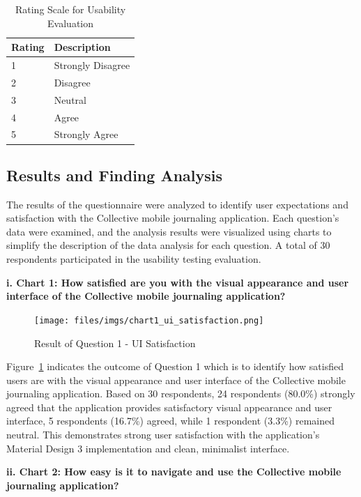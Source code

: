 \begin{table}[H]
\centering
\caption{Rating Scale for Usability Evaluation}
\label{tab:rating-scale}
\begin{tabular}{|p{1.5cm}|p{12.5cm}|}
\hline
\textbf{Rating} & \textbf{Description} \\
\hline
1 & Strongly Disagree \\
\hline
2 & Disagree \\
\hline
3 & Neutral \\
\hline
4 & Agree \\
\hline
5 & Strongly Agree \\
\hline
\end{tabular}
\end{table}

\subsection{Results and Finding Analysis}\label{sec:resultsFindings}

The results of the questionnaire were analyzed to identify user expectations and satisfaction with the Collective mobile journaling application. Each question's data were examined, and the analysis results were visualized using charts to simplify the description of the data analysis for each question. A total of 30 respondents participated in the usability testing evaluation.

\textbf{i. Chart 1: How satisfied are you with the visual appearance and user interface of the Collective mobile journaling application?}

\begin{figure}[H]
\centering
\texttt{[image: files/imgs/chart1\_ui\_satisfaction.png]}
\caption{Result of Question 1 - UI Satisfaction}
\label{fig:chart1-ui}
\end{figure}

Figure~\ref{fig:chart1-ui} indicates the outcome of Question 1 which is to identify how satisfied users are with the visual appearance and user interface of the Collective mobile journaling application. Based on 30 respondents, 24 respondents (80.0\%) strongly agreed that the application provides satisfactory visual appearance and user interface, 5 respondents (16.7\%) agreed, while 1 respondent (3.3\%) remained neutral. This demonstrates strong user satisfaction with the application's Material Design 3 implementation and clean, minimalist interface.

\textbf{ii. Chart 2: How easy is it to navigate and use the Collective mobile journaling application?}

